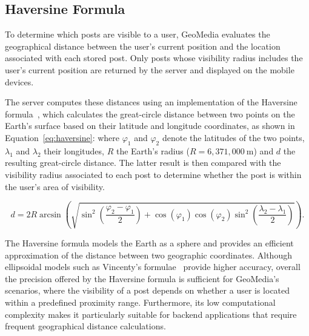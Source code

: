 \subsection{Haversine Formula}
\label{haversine_formula}

To determine which posts are visible to a user, GeoMedia evaluates the geographical distance between the user's current position and the location associated with each stored post. Only posts whose visibility radius includes the user's current position are returned by the server and displayed on the mobile devices.

The server computes these distances using an implementation of the Haversine formula~\cite{article:sinnott1984haversine}, which calculates the great-circle distance between two points on the Earth's surface based on their latitude and longitude coordinates, as shown in Equation~\ref{eq:haversine}: where $\varphi_1$ and $\varphi_2$ denote the latitudes of the two points, $\lambda_1$ and $\lambda_2$ their longitudes, $R$ the Earth's radius ($R = 6{,}371{,}000~\mathrm{m}$) and $d$ the resulting great-circle distance. The latter result is then compared with the visibility radius associated to each post to determine whether the post is within the user's area of visibility.

\begin{equation}
d = 2R\arcsin\left(
\sqrt{
\sin^2\left(\frac{\varphi_2-\varphi_1}{2}\right)
+
\cos(\varphi_1)\cos(\varphi_2)
\sin^2\left(\frac{\lambda_2-\lambda_1}{2}\right)
}
\right).
\label{eq:haversine}
\end{equation}



The Haversine formula models the Earth as a sphere and provides an efficient approximation of the distance between two geographic coordinates. Although ellipsoidal models such as Vincenty's formulae~\cite{site:vincenty-formulae} provide higher accuracy, overall the precision offered by the Haversine formula is sufficient for GeoMedia's scenarios, where the visibility of a post depends on whether a user is located within a predefined proximity range. Furthermore, its low computational complexity makes it particularly suitable for backend applications that require frequent geographical distance calculations.




